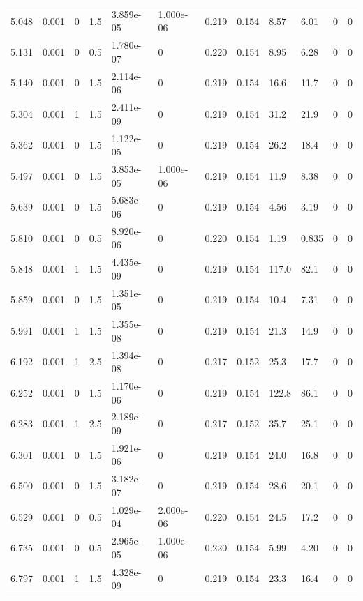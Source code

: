 \documentclass[preview]{standalone}
\begin{document}
{{{\begin{tabular}{L{1.2cm}C{1.2cm} C{0.3cm}C{0.5cm} C{1.4cm}C{1.4cm} C{1.4cm}C{1.4cm} C{1.6cm}C{1.6cm} C{1.6cm}C{1.6cm}}
  5.048  &  0.001  & 0     & 1.5 &  3.859e-05  & 1.000e-06  &  0.219&   0.154& 8.57 & 6.01   &  0 & 0  \\ 
  5.131  &  0.001  & 0     & 0.5 &  1.780e-07  & 0  &  0.220&   0.154& 8.95 & 6.28   &  0 & 0  \\ 
  5.140  &  0.001  & 0     & 1.5 &  2.114e-06  & 0  &  0.219&   0.154& 16.6 & 11.7   &  0 & 0  \\ 
  5.304  &  0.001  & 1     & 1.5 &  2.411e-09  & 0  &  0.219&   0.154& 31.2 & 21.9   &  0 & 0  \\ 
  5.362  &  0.001  & 0     & 1.5 &  1.122e-05  & 0  &  0.219&   0.154& 26.2 & 18.4   &  0 & 0  \\ 
  5.497  &  0.001  & 0     & 1.5 &  3.853e-05  & 1.000e-06  &  0.219&   0.154& 11.9 & 8.38   &  0 & 0  \\ 
  5.639  &  0.001  & 0     & 1.5 &  5.683e-06  & 0  &  0.219&   0.154& 4.56 & 3.19   &  0 & 0  \\ 
  5.810  &  0.001  & 0     & 0.5 &  8.920e-06  & 0  &  0.220&   0.154& 1.19 & 0.835   &  0 & 0  \\ 
  5.848  &  0.001  & 1     & 1.5 &  4.435e-09  & 0  &  0.219&   0.154& 117.0 & 82.1   &  0 & 0  \\ 
  5.859  &  0.001  & 0     & 1.5 &  1.351e-05  & 0  &  0.219&   0.154& 10.4 & 7.31   &  0 & 0  \\ 
  5.991  &  0.001  & 1     & 1.5 &  1.355e-08  & 0  &  0.219&   0.154& 21.3 & 14.9   &  0 & 0  \\ 
  6.192  &  0.001  & 1     & 2.5 &  1.394e-08  & 0  &  0.217&   0.152& 25.3 & 17.7   &  0 & 0  \\ 
  6.252  &  0.001  & 0     & 1.5 &  1.170e-06  & 0  &  0.219&   0.154& 122.8 & 86.1   &  0 & 0  \\ 
  6.283  &  0.001  & 1     & 2.5 &  2.189e-09  & 0  &  0.217&   0.152& 35.7 & 25.1   &  0 & 0  \\ 
  6.301  &  0.001  & 0     & 1.5 &  1.921e-06  & 0  &  0.219&   0.154& 24.0 & 16.8   &  0 & 0  \\ 
  6.500  &  0.001  & 0     & 1.5 &  3.182e-07  & 0  &  0.219&   0.154& 28.6 & 20.1   &  0 & 0  \\ 
  6.529  &  0.001  & 0     & 0.5 &  1.029e-04  & 2.000e-06  &  0.220&   0.154& 24.5 & 17.2   &  0 & 0  \\ 
  6.735  &  0.001  & 0     & 0.5 &  2.965e-05  & 1.000e-06  &  0.220&   0.154& 5.99 & 4.20   &  0 & 0  \\ 
  6.797  &  0.001  & 1     & 1.5 &  4.328e-09  & 0  &  0.219&   0.154& 23.3 & 16.4   &  0 & 0  \\ 

\end{tabular}}}}
\end{document}
